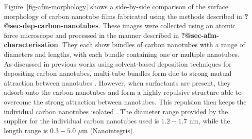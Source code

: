 \documentclass[
  a4paper,
]{scrbook}
\begin{document}
Figure~\ref{fig-afm-morphology} shows a side-by-side comparison of the
surface morphology of carbon nanotube films fabricated using the methods
described in \textbf{?@sec-dep-carbon-nanotubes}. These images were
collected using an atomic force microscope and processed in the manner
described in \textbf{?@sec-afm-characterisation}. They each show bundles
of carbon nanotubes with a range of diameters and lengths, with each
bundle containing one or multiple nanotubes. As discussed in previous
works using solvent-based deposition techniques for depositing carbon
nanotubes, multi-tube bundles form due to strong mutual attraction
between nanotubes
\autocite{Zheng2017,Murugathas2018,Murugathas2019a,Nguyen2021}. However,
when surfactants are present, they adsorb onto the carbon nanotubes and
form a highly repulsive structure able to overcome the strong attraction
between nanotubes. This repulsion then keeps the individual carbon
nanotubes isolated
\autocite{Wenseleers2004,Gavrel2013,Hermanson2013-16,Shimizu2013,DiCrescenzo2014}.
The diameter range provided by the supplier for the individual carbon
nanotubes used is \(1.2-1.7\) nm, while the length range is \(0.3-5.0\)
\(\mu\)m (Nanointegris).
\end{document}

